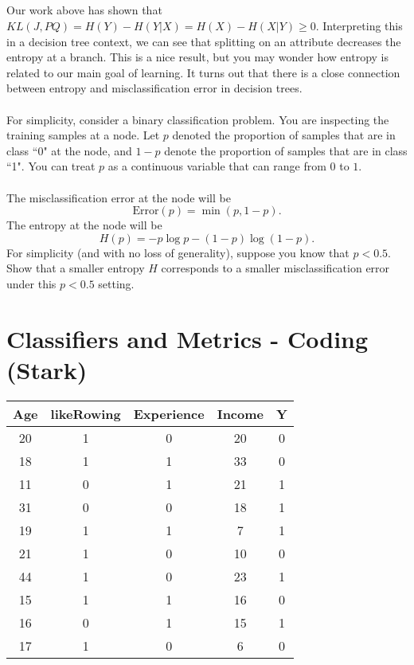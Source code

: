 \documentclass{exam}
\begin{document}
\subsection{}
Our work above has shown that $KL(J, PQ) = H(Y) - H(Y|X) = H(X) - H(X|Y) \geq 0$. Interpreting this in a decision tree context, we can see that splitting on an attribute decreases the entropy at a branch. This is a nice result, but you may wonder how entropy is related to our main goal of learning. It turns out that there is a close connection between entropy and misclassification error in decision trees. 
\\\\
For simplicity, consider a binary classification problem. You are inspecting the training samples at a node. Let $p$ denoted the proportion of samples that are in class ``0" at the node, and $1-p$ denote the proportion of samples that are in class ``1". You can treat $p$ as a continuous variable that can range from $0$ to $1$. 
\\\\
The misclassification error at the node will be $$\text{Error}(p) = \min(p, 1-p).$$ 
The entropy at the node will be $$H(p) = -p\log p  - (1-p) \log (1-p).$$
For simplicity (and with no loss of generality), suppose you know that $p < 0.5$. Show that a smaller entropy $H$ corresponds to a smaller misclassification error under this $p < 0.5$ setting.  

\section{Classifiers and Metrics - Coding (Stark)}

\begin{center}
\begin{tabular}[c]{c|c|c|c||c}
Age & likeRowing & Experience & Income & Y \\ \hline
20 & 1 & 0 & 20 & 0 \\
18 & 1 & 1 & 33 & 0 \\
11 & 0 & 1 & 21 & 1 \\
31 & 0 & 0 & 18 & 1 \\
19 & 1 & 1 & 7 & 1 \\
21 & 1 & 0 & 10 & 0 \\
44 & 1 & 0 & 23 & 1 \\
15 & 1 & 1 & 16 & 0 \\
16 & 0 & 1 & 15 & 1 \\
17 & 1 & 0 & 6 & 0 \\
\end{tabular}
\end{center}
\end{document}
